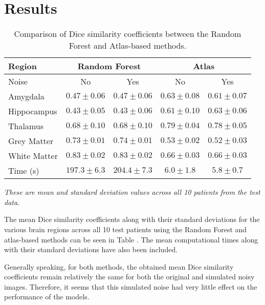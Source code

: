 \newcommand{\RNum}[1]{\uppercase\expandafter{\romannumeral #1\relax}}

\section{Results}

\setlength{\tabcolsep}{3pt}
\begin{table}[ht]
	\begin{flushleft}
		\caption{Comparison of Dice similarity coefficients between the Random Forest and Atlas-based methods.}
		\begin{tabularx}{\linewidth}{Xcccc}
			\toprule
			\multirow{2}{*}{Region} & \multicolumn{2}{c}{Random Forest} & \multicolumn{2}{c}{Atlas} \\ 
			\cmidrule(lr){2-3} \cmidrule(lr){4-5}
			\midrule
			Noise & No & Yes & No & Yes \\
			Amygdala & $0.47 \pm 0.06$ & $0.47 \pm 0.06$ & $\mathbf{0.63 \pm 0.08}$ & $0.61 \pm 0.07$ \\
			Hippocampus & $0.43 \pm 0.05$ & $0.43 \pm 0.06$ & $0.61 \pm 0.10$ & $\mathbf{0.63 \pm 0.06}$ \\
			Thalamus & $0.68 \pm 0.10$ & $0.68 \pm 0.10$ & $\mathbf{0.79\pm 0.04}$ & $0.78 \pm 0.05$ \\
			Grey Matter & $0.73 \pm 0.01$ & $\mathbf{0.74 \pm 0.01}$ & $0.53 \pm 0.02 $ & $0.52 \pm 0.03$ \\
			White Matter & $\mathbf{0.83 \pm 0.02}$ & $\mathbf{0.83 \pm 0.02}$ & $0.66 \pm 0.03$ & $0.66 \pm 0.03$ \\
			Time (s)  & $197.3 \pm 6.3$  & $204.4 \pm 7.3$  & $6.0 \pm 1.8$  & $\mathbf{5.8 \pm 0.7}$ \\
			\bottomrule
		\end{tabularx}
	\end{flushleft}	
	\scriptsize{\textit{These are mean and standard deviation values across all 10 patients from the test data.}}
	\label{tab:performance_comparison}
\end{table}

The mean Dice similarity coefficients along with their standard deviations for the various brain regions across all 10 test patients using the Random Forest and atlas-based methods can be seen in Table \RNum{1}. The mean computational times along with their standard deviations have also been included.

Generally speaking, for both methods, the obtained mean Dice similarity coefficients remain relatively the same for both the original and simulated noisy images. Therefore, it seems that this simulated noise had very little effect on the performance of the models.

